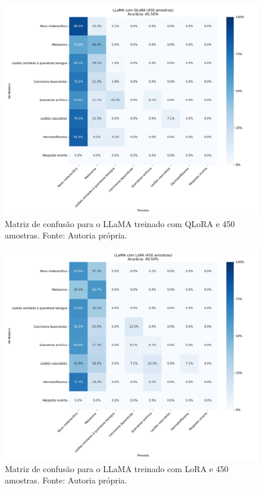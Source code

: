 \begin{figure}[ht]
    \centering
    \includegraphics[width=1\columnwidth,keepaspectratio]{images/confusion_matrix_qlora_450.png}
    \caption{\small Matriz de confusão para o \ac{LLaMA} treinado com \ac{QLoRA} e 450 amostras. Fonte: Autoria
        própria.}
    \label{fig:confusion_matrix_qlora_450}
\end{figure}

\clearpage

\begin{figure}[ht]
    \centering
    \includegraphics[width=1\columnwidth,keepaspectratio]{images/confusion_matrix_lora_450.png}
    \caption{\small Matriz de confusão para o \ac{LLaMA} treinado com \ac{LoRA} e 450 amostras. Fonte: Autoria
        própria.}
    \label{fig:confusion_matrix_lora_450}
\end{figure}

